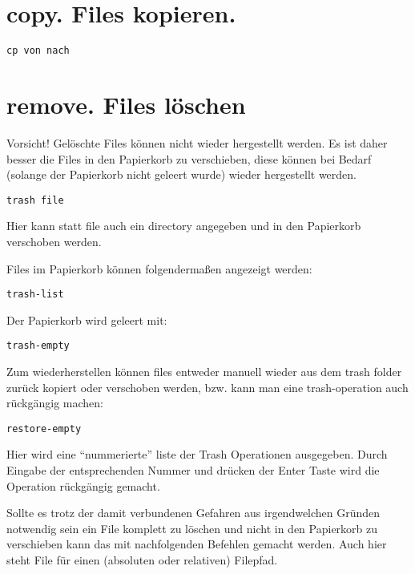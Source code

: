 \documentclass[]{book}
\begin{document}
\hypertarget{copy.-files-kopieren.}{%
\section{copy. Files kopieren.}\label{copy.-files-kopieren.}}

\begin{verbatim}
cp von nach
\end{verbatim}

\hypertarget{remove.-files-loschen}{%
\section{remove. Files löschen}\label{remove.-files-loschen}}

Vorsicht! Gelöschte Files können nicht wieder hergestellt werden.
Es ist daher besser die Files in den Papierkorb zu verschieben, diese
können bei Bedarf (solange der Papierkorb nicht geleert wurde) wieder
hergestellt werden.

\begin{verbatim}
trash file
\end{verbatim}

Hier kann statt file auch ein directory angegeben und in den Papierkorb verschoben werden.

Files im Papierkorb können folgendermaßen angezeigt werden:

\begin{verbatim}
trash-list
\end{verbatim}

Der Papierkorb wird geleert mit:

\begin{verbatim}
trash-empty
\end{verbatim}

Zum wiederherstellen können files entweder manuell wieder
aus dem trash folder zurück kopiert oder verschoben werden, bzw. kann man eine trash-operation auch rückgängig machen:

\begin{verbatim}
restore-empty
\end{verbatim}

Hier wird eine ``nummerierte'' liste der Trash Operationen ausgegeben. Durch Eingabe der entsprechenden Nummer und drücken der Enter Taste wird die
Operation rückgängig gemacht.

Sollte es trotz der damit verbundenen Gefahren aus irgendwelchen Gründen notwendig sein ein File
komplett zu löschen und nicht in den Papierkorb zu verschieben kann das mit nachfolgenden Befehlen
gemacht werden. Auch hier steht File für einen (absoluten oder relativen) Filepfad.
\end{document}
